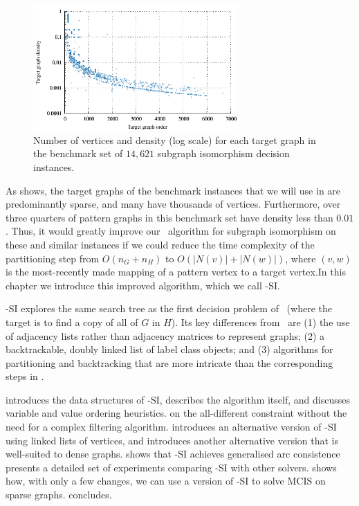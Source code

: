 \begin{figure}[htb]
    \centering
    \includegraphics*[width=0.7\textwidth]{14b-mcsplit-induced-si/density-chart/plots/n-density-pdf}
    \caption{Number of vertices and density (log scale) for each target graph in the benchmark set
    of $14,621$ subgraph isomorphism decision instances.}
    \label{figure:si-targets-n-density}
\end{figure}

As  shows, the target graphs of the benchmark
instances that we will use in  are
predominantly sparse, and many have thousands of vertices.  Furthermore, over three
quarters of pattern graphs in this benchmark set have density less than $0.01$.
Thus, it would greatly improve our \McSplit\ algorithm for subgraph isomorphism
on these and similar instances if we could reduce the time complexity of the
partitioning step from $O(n_G + n_H)$ to $O(|N(v)| + |N(w)|)$, where $(v,w)$ is
the most-recently made mapping of a pattern vertex to a target vertex.In this
chapter we introduce this improved algorithm, which we call \McSplit-SI.

\McSplit-SI explores the same search tree as the first decision problem of
\McSplitDown\ (where the target is to find a copy of all of $G$ in $H$).
Its key differences from
\McSplit\ are (1) the use of adjacency lists rather than adjacency matrices
to represent graphs; (2) a backtrackable, doubly linked list of label class objects;
and (3) algorithms for partitioning and backtracking that are more intricate
than the corresponding steps in \McSplit.

 introduces the data structures of \McSplit-SI,
 describes the algorithm itself, and
 discusses variable and value ordering heuristics.
on the all-different constraint without the need for a complex filtering algorithm.
 introduces an alternative version of \McSplit-SI
using linked lists of vertices,
 and introduces another alternative version that is
well-suited to dense graphs.
 shows that \McSplit-SI achieves generalised arc consistence
 presents a detailed set of experiments comparing
\McSplit-SI with other solvers.
 shows how, with only a few changes, we can use a version
of \McSplit-SI to solve MCIS on sparse graphs.
 concludes.

